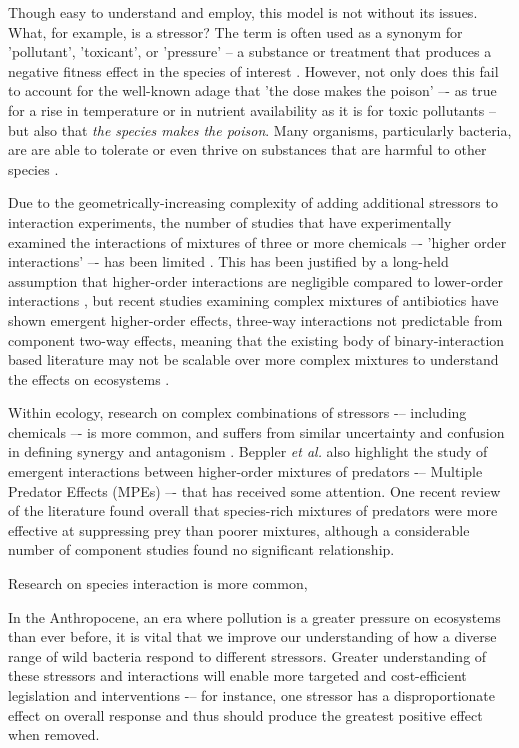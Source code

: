 \documentclass[final,1p,times]{elsarticle}
\begin{document}
Though easy to understand and employ, this model is not without its issues. What, for example, is a stressor? The term is often used as a synonym for 'pollutant', 'toxicant', or 'pressure' -- a substance or treatment that produces a negative fitness effect in the species of interest \cite{Piggott2015}. However, not only does this fail to account for the well-known adage that 'the dose makes the poison'\cite{OGParacelsus} –- as true for a rise in temperature or in nutrient availability as it is for toxic pollutants -- but also that \textit{the species makes the poison}. Many organisms, particularly bacteria, are are able to tolerate or even thrive on substances that are harmful to other species \cite{Malik2004,Gadd2009}. 

Due to the geometrically-increasing complexity of adding additional stressors to interaction experiments, the number of studies that have experimentally examined the interactions of mixtures of three or more chemicals –- 'higher order interactions' –- has been limited \cite{Beppler2016}. This has been justified by a long-held assumption that higher-order interactions are negligible compared to lower-order interactions \cite{Tekin2017PrevalenceInteractions}, but recent studies examining complex mixtures of antibiotics have shown emergent higher-order effects,  three-way interactions not predictable from component two-way effects, meaning that the existing body of binary-interaction based literature may not be scalable over more complex mixtures to understand the effects on ecosystems \cite{Tekin2016, Zimmer2016, Tekin2017}.

Within ecology, research on complex combinations of stressors -– including chemicals –- is more common, and suffers from similar uncertainty and confusion in defining synergy and antagonism \cite{Cote2016}.  Beppler \textit{et al.} also highlight the study of emergent interactions between higher-order mixtures of predators -– Multiple Predator Effects (MPEs) –- that has received some attention. One recent review of the literature \cite{Griffin2013EffectsMeta-analysis} found overall that species-rich mixtures of predators were more effective at suppressing prey than poorer mixtures, although a considerable number of component studies found no significant relationship. 

Research on species interaction is more common,

In the Anthropocene, an era where pollution is a greater pressure on ecosystems than ever before, it is vital that we improve our understanding of how a diverse range of wild bacteria respond to different stressors. Greater understanding of these stressors and interactions will enable more targeted and cost-efficient legislation and interventions -– for instance, one stressor has a disproportionate effect on overall response and thus should produce the greatest positive effect when removed. 
\end{document}
